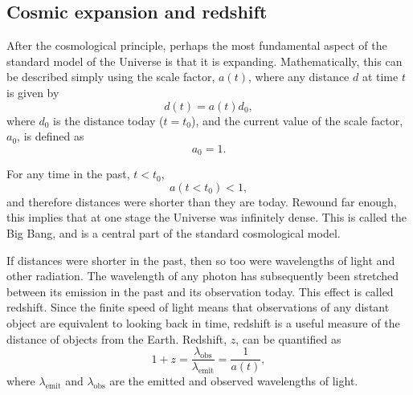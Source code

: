 \subsection{Cosmic expansion and redshift}

After the cosmological principle, perhaps the most fundamental aspect of the standard model of the Universe is that it is expanding. Mathematically, this can be described simply using the scale factor, $a \left( t \right)$, where any distance $d$ at time $t$ is given by
\begin{equation}
d \left( t \right) = a \left( t \right) d_0,
\end{equation}
where $d_0$ is the distance today ($t = t_0$), and the current value of the scale factor, $a_0$, is defined as
\begin{equation}
a_0 = 1.
\end{equation}

For any time in the past, $t < t_0$,
\begin{equation}
a \left( t < t_0 \right) < 1,
\end{equation}
and therefore distances were shorter than they are today. Rewound far enough, this implies that at one stage the Universe was infinitely dense. This is called the Big Bang, and is a central part of the standard cosmological model.

If distances were shorter in the past, then so too were wavelengths of light and other radiation. The wavelength of any photon has subsequently been stretched between its emission in the past and its observation today.
This effect is called redshift. Since the finite speed of light means that observations of any distant object are equivalent to looking back in time, redshift is a useful measure of the distance of objects from the Earth. Redshift, $z$, can be quantified as
\begin{equation}
1 + z = \frac{\lambda_\text{obs}}{\lambda_\text{emit}}
= \frac{1}{a \left( t \right)},
\end{equation}
where $\lambda_\text{emit}$ and $\lambda_\text{obs}$ are the emitted and observed wavelengths of light.

